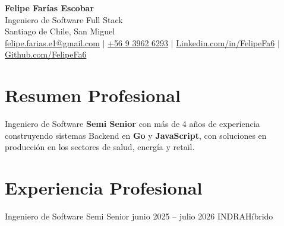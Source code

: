 








\begin{center}
        \textbf{\Huge Felipe Farías Escobar} \\
        \vspace{4pt}
        \small Ingeniero de Software Full Stack \\ \vspace{1pt}
        Santiago de Chile, San Miguel \\

        \href{mailto:felipe.farias.e1@gmail.com}{felipe.farias.e1@gmail.com} $|$
        \href{https://wa.me/56939626293}{+56 9 3962 6293} $|$
        \href{https://www.linkedin.com/in/FelipeFa6/}{Linkedin.com/in/FelipeFa6}
        $|$
        \href{https://github.com/FelipeFa6}{Github.com/FelipeFa6}
\end{center}

\vspace{-18pt}

\section{Resumen Profesional}

{\small
        Ingeniero de Software \textbf{Semi Senior} con más de 4 años de
        experiencia construyendo sistemas Backend en \textbf{Go} y
        \textbf{JavaScript}, con soluciones en producción en los sectores de
        salud, energía y retail.
}

\section{Experiencia Profesional}

\resumeSubHeadingListStart

\resumeSubheading
{Ingeniero de Software Semi Senior} {junio 2025 -- julio 2026}
{INDRA}{Híbrido}
\resumeItemListStart



